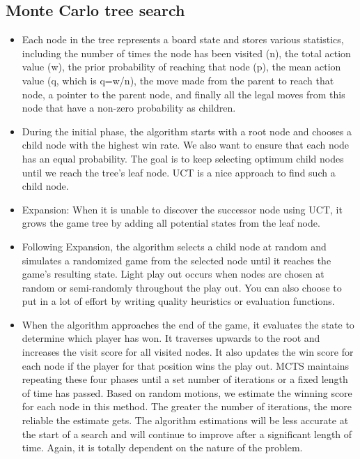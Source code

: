 \documentclass[10pt,twocolumn]{article}
\begin{document}
\subsection{Monte Carlo tree search}
    \begin{itemize}
    \item Each node in the tree represents a board state and stores various statistics, including the number of times the node has been visited (n), the total action value (w), the prior probability of reaching that node (p), the mean action value (q, which is q=w/n), the move made from the parent to reach that node, a pointer to the parent node, and finally all the legal moves from this node that have a non-zero probability as children\cite{Java}.
    \item During the initial phase, the algorithm starts with a root node and chooses a child node with the highest win rate. We also want to ensure that each node has an equal probability. The goal is to keep selecting optimum child nodes until we reach the tree's leaf node. UCT is a nice approach to find such a child node\cite{Java}.
    \item Expansion: When it is unable to discover the successor node using UCT, it grows the game tree by adding all potential states from the leaf node.
    \item Following Expansion, the algorithm selects a child node at random and simulates a randomized game from the selected node until it reaches the game's resulting state. Light play out occurs when nodes are chosen at random or semi-randomly throughout the play out. You can also choose to put in a lot of effort by writing quality heuristics or evaluation functions\cite{Java}.
    \item When the algorithm approaches the end of the game, it evaluates the state to determine which player has won. It traverses upwards to the root and increases the visit score for all visited nodes. It also updates the win score for each node if the player for that position wins the play out. MCTS maintains repeating these four phases until a set number of iterations or a fixed length of time has passed. Based on random motions, we estimate the winning score for each node in this method. The greater the number of iterations, the more reliable the estimate gets. The algorithm estimations will be less accurate at the start of a search and will continue to improve after a significant length of time. Again, it is totally dependent on the nature of the problem.\cite{Dylan}

\end{itemize}
\end{document}
